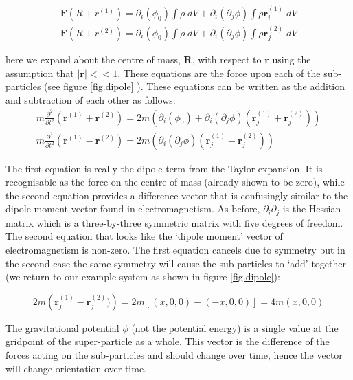 \begin{eqnarray}
\mathbf{F} (R +r^{(1)}) = \partial_i(\phi_0) \int \rho\;dV + \partial_i(\partial_j \phi) \int \rho \mathbf{r}^{(1)}_i\;dV \\
\mathbf{F} (R +r^{(2)}) = \partial_i(\phi_0) \int \rho\;dV + \partial_i(\partial_j \phi) \int \rho \mathbf{r}^{(2)}_j\;dV 
\end{eqnarray}

\noindent here we expand about the centre of mass, $\mathbf{R}$, with respect to $\mathbf{r}$ using the assumption that $|\mathbf{r}|<<1$. These equations are the force upon each of the sub-particles (see figure \ref{fig.dipole} ). These equations can be written as the addition and subtraction of each other as follows:
\begin{eqnarray}
m \frac{\partial^2}{\partial t^2} (\mathbf{r}^{(1)} + \mathbf{r}^{(2)}) = 2m \left(\partial_i(\phi_0) + \partial_i(\partial_j \phi) (\mathbf{r}^{(1)}_j + \mathbf{r}^{(2)}_j) \right) \\
m \frac{\partial^2}{\partial t^2} (\mathbf{r}^{(1)} - \mathbf{r}^{(2)}) = 2m  \left(\partial_i(\partial_j \phi)  (\mathbf{r}^{(1)}_j - \mathbf{r}^{(2)}_j)\right)
\end{eqnarray}

\noindent The first equation is really the dipole term from the Taylor expansion. It is recognisable as the force on the centre of mass (already shown to be zero), while the second equation provides a difference vector that is confusingly similar to the dipole moment vector found in electromagnetism. As before, $\partial_i\partial_j$ is the Hessian matrix which is a three-by-three symmetric matrix with five degrees of freedom. The second equation that looks like the `dipole moment' vector of electromagnetism is non-zero. The first equation cancels due to symmetry but in the second case the same symmetry will cause the sub-particles to `add' together (we return to our example system as shown in figure \ref{fig.dipole}):

\begin{equation}
2m \left(\mathbf{r}^{(1)}_j - \mathbf{r}^{(2)}_j)\right) = 2m [(x,0,0) - (-x,0,0)] = 4m (x,0,0)
\end{equation}

The gravitational potential $\phi$ (not the potential energy) is a single value at the gridpoint of the super-particle as a whole. This vector is the difference of the forces acting on the sub-particles and should change over time, hence the vector will change orientation over time.

